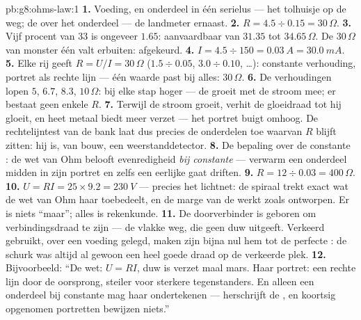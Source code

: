 \begin{solution}{pb:g8:ohms-law:1}
\textbf{1.} Voeding,  en onderdeel in één serielus
--- het tolhuisje op de weg; de  over het onderdeel
--- de landmeter ernaast.
\textbf{2.} $R = 4.5 \div 0.15 = 30\,\Omega$.
\textbf{3.} Vijf procent van $33$ is ongeveer $1.65$: aanvaardbaar van
$31.35$ tot $34.65\,\Omega$. De $30\,\Omega$ van monster één valt
erbuiten: afgekeurd.
\textbf{4.} $I = 4.5 \div 150 = \qty{0.03}{A} = \qty{30.0}{mA}$.
\textbf{5.} Elke rij geeft $R = U/I = 30\,\Omega$ ($1.5 \div 0.05$,
$3.0 \div 0.10$, \dots): constante verhouding, portret als rechte lijn
--- één waarde past bij alles: $30\,\Omega$.
\textbf{6.} De verhoudingen lopen $5$, $6.7$, $8.3$, $10\,\Omega$: bij
elke stap hoger --- de  groeit met de stroom mee;
er bestaat geen enkele $R$.
\textbf{7.} Terwijl de stroom groeit, verhit de gloeidraad tot
hij gloeit, en heet metaal biedt meer verzet --- het portret buigt
omhoog. De rechtelijntest van de bank laat dus precies de onderdelen
toe waarvan $R$ blijft zitten: hij is, van bouw, een weerstanddetector.
\textbf{8.} De bepaling over de constante : de wet
van Ohm belooft evenredigheid \emph{bij constante
} --- verwarm een onderdeel midden in zijn portret
en zelfs een eerlijke  gaat driften.
\textbf{9.} $R = 12 \div 0.03 = 400\,\Omega$.
\textbf{10.} $U = R I = 25 \times 9.2 = \qty{230}{V}$ --- precies het
lichtnet: de spiraal trekt exact wat de wet van Ohm haar toebedeelt, en
de marge van de  werkt zoals ontworpen. Er is niets
``maar''; alles is rekenkunde.
\textbf{11.} De doorverbinder is geboren om verbindingsdraad te zijn
--- de vlakke weg, die geen duw uitgeeft. Verkeerd gebruikt, over een
voeding gelegd, maken zijn bijna nul  hem tot de perfecte
: de schurk was altijd al gewoon een heel goede
draad op de verkeerde plek.
\textbf{12.} Bijvoorbeeld: ``De wet: $U = R I$, duw is verzet maal
mars. Haar portret: een rechte lijn door de oorsprong, steiler voor
sterkere tegenstanders. En alleen een onderdeel bij constante
 mag haar ondertekenen --- 
herschrijft de , en koortsig opgenomen portretten
bewijzen niets.''
\end{solution}
